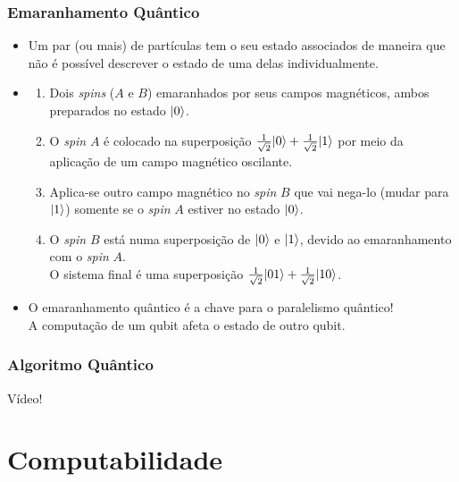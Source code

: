 \documentclass{beamer}
\DeclarePairedDelimiter\ket{\lvert}{\rangle}
\begin{document}
\begin{frame}
\frametitle{Emaranhamento Quântico}
\begin{itemize}
  \item Um par (ou mais) de partículas tem o seu estado associados de
  maneira que não é possível descrever o estado de uma delas
  individualmente.
\item
  \begin{enumerate}
    \item Dois \textit{spins} ($A$ e $B$) emaranhados por
      seus campos magnéticos, ambos preparados no estado $\ket{0}$.
    \item O \textit{spin} $A$ é colocado na superposição
      $\frac{1}{\sqrt{2}} \ket{0} + \frac{1}{\sqrt{2}} \ket{1}$ por meio da
      aplicação de um campo magnético oscilante.
    \item Aplica-se outro campo magnético no \textit{spin} $B$ que vai nega-lo (mudar para
      $\ket{1}$) somente se o \textit{spin} $A$ estiver no estado $\ket{0}$.
    \item O \textit{spin} $B$ está numa superposição de $\ket{0}$ e $\ket{1}$,
      devido ao emaranhamento com o \textit{spin} $A$.\\
      O sistema final é uma superposição
      $\frac{1}{\sqrt{2}} \ket{01} + \frac{1}{\sqrt{2}} \ket{10}$.
  \end{enumerate}
  \item O emaranhamento quântico é a chave para o paralelismo quântico!
    \\ A computação de um qubit afeta o estado de outro qubit.
\end{itemize}
\end{frame}

\begin{frame}
\frametitle{Algoritmo Quântico}
\centering
\Large Vídeo!
\end{frame}

\section{Computabilidade}
\end{document}
